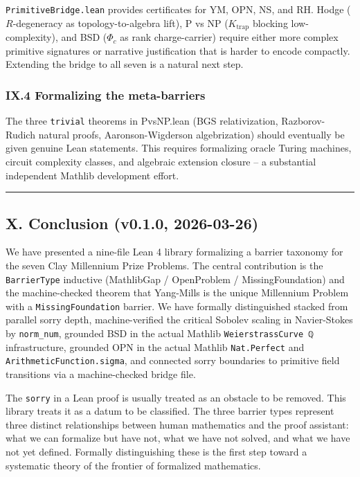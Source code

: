 \documentclass[12pt,a4paper]{article}
\begin{document}
\texttt{PrimitiveBridge.lean} provides certificates for YM, OPN, NS, and RH. Hodge ($R$-degeneracy as topology-to-algebra lift), P vs NP ($K_\text{trap}$ blocking low-complexity), and BSD ($\Phi_c$ as rank charge-carrier) require either more complex primitive signatures or narrative justification that is harder to encode compactly. Extending the bridge to all seven is a natural next step.

\subsubsection{IX.4 Formalizing the meta-barriers}

The three \texttt{trivial} theorems in PvsNP.lean (BGS relativization, Razborov-Rudich natural proofs, Aaronson-Wigderson algebrization) should eventually be given genuine Lean statements. This requires formalizing oracle Turing machines, circuit complexity classes, and algebraic extension closure  --  a substantial independent Mathlib development effort.

\begin{center}
\rule{0.5\textwidth}{0.4pt}
\end{center}

\subsection{X. Conclusion (v0.1.0, 2026-03-26)}

We have presented a nine-file Lean 4 library formalizing a barrier taxonomy for the seven Clay Millennium Prize Problems. The central contribution is the \texttt{BarrierType} inductive (MathlibGap / OpenProblem / MissingFoundation) and the machine-checked theorem that Yang-Mills is the unique Millennium Problem with a \texttt{MissingFoundation} barrier. We have formally distinguished stacked from parallel sorry depth, machine-verified the critical Sobolev scaling in Navier-Stokes by \texttt{norm\_num}, grounded BSD in the actual Mathlib \texttt{WeierstrassCurve ℚ} infrastructure, grounded OPN in the actual Mathlib \texttt{Nat.Perfect} and \texttt{ArithmeticFunction.sigma}, and connected sorry boundaries to primitive field transitions via a machine-checked bridge file.

The \texttt{sorry} in a Lean proof is usually treated as an obstacle to be removed. This library treats it as a datum to be classified. The three barrier types represent three distinct relationships between human mathematics and the proof assistant: what we can formalize but have not, what we have not solved, and what we have not yet defined. Formally distinguishing these is the first step toward a systematic theory of the frontier of formalized mathematics.
\end{document}

